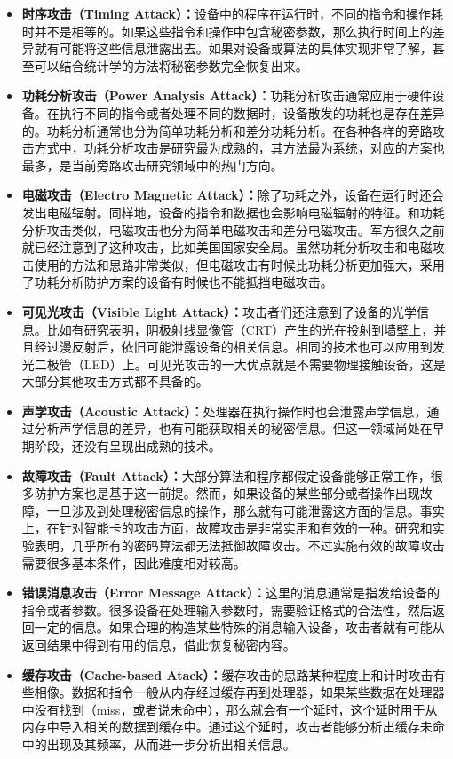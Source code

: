 \begin{itemize}
\item \textbf{时序攻击（Timing Attack）：}设备中的程序在运行时，不同的指令和操作耗时并不是相等的。如果这些指令和操作中包含秘密参数，那么执行时间上的差异就有可能将这些信息泄露出去。如果对设备或算法的具体实现非常了解，甚至可以结合统计学的方法将秘密参数完全恢复出来。
\item \textbf{功耗分析攻击（Power Analysis Attack）：}功耗分析攻击通常应用于硬件设备。在执行不同的指令或者处理不同的数据时，设备散发的功耗也是存在差异的。功耗分析通常也分为简单功耗分析和差分功耗分析。在各种各样的旁路攻击方式中，功耗分析攻击是研究最为成熟的，其方法最为系统，对应的方案也最多，是当前旁路攻击研究领域中的热门方向。
\item \textbf{电磁攻击（Electro Magnetic Attack）：}除了功耗之外，设备在运行时还会发出电磁辐射。同样地，设备的指令和数据也会影响电磁辐射的特征。和功耗分析攻击类似，电磁攻击也分为简单电磁攻击和差分电磁攻击。军方很久之前就已经注意到了这种攻击，比如美国国家安全局。虽然功耗分析攻击和电磁攻击使用的方法和思路非常类似，但电磁攻击有时候比功耗分析更加强大，采用了功耗分析防护方案的设备有时候也不能抵挡电磁攻击。
\item \textbf{可见光攻击（Visible Light Attack）：}攻击者们还注意到了设备的光学信息。比如有研究表明，阴极射线显像管（CRT）产生的光在投射到墙壁上，并且经过漫反射后，依旧可能泄露设备的相关信息。相同的技术也可以应用到发光二极管（LED）上。可见光攻击的一大优点就是不需要物理接触设备，这是大部分其他攻击方式都不具备的。
\item \textbf{声学攻击（Acoustic Attack）：}处理器在执行操作时也会泄露声学信息，通过分析声学信息的差异，也有可能获取相关的秘密信息。但这一领域尚处在早期阶段，还没有呈现出成熟的技术。
\item \textbf{故障攻击（Fault Attack）：}大部分算法和程序都假定设备能够正常工作，很多防护方案也是基于这一前提。然而，如果设备的某些部分或者操作出现故障，一旦涉及到处理秘密信息的操作，那么就有可能泄露这方面的信息。事实上，在针对智能卡的攻击方面，故障攻击是非常实用和有效的一种。研究和实验表明，几乎所有的密码算法都无法抵御故障攻击。不过实施有效的故障攻击需要很多基本条件，因此难度相对较高。
\item \textbf{错误消息攻击（Error Message Attack）：}这里的消息通常是指发给设备的指令或者参数。很多设备在处理输入参数时，需要验证格式的合法性，然后返回一定的信息。如果合理的构造某些特殊的消息输入设备，攻击者就有可能从返回结果中得到有用的信息，借此恢复秘密内容。
\item \textbf{缓存攻击（Cache-based Atack）：}缓存攻击的思路某种程度上和计时攻击有些相像。数据和指令一般从内存经过缓存再到处理器，如果某些数据在处理器中没有找到（miss，或者说未命中），那么就会有一个延时，这个延时用于从内存中导入相关的数据到缓存中。通过这个延时，攻击者能够分析出缓存未命中的出现及其频率，从而进一步分析出相关信息。

\end{itemize}
